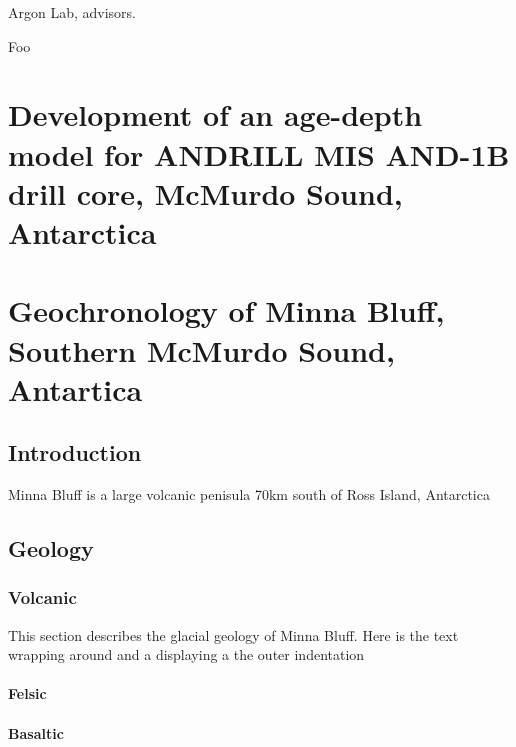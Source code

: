 \documentclass[12pt]{report}
\begin{document}
\begin{acknowledgments}
{Argon Lab, advisors.}

\end{acknowledgments}
\setcounter{tocdepth}{4}
\tableofcontents
%
%
\listoftables
\listoffigures
\signaturepage
\begin{preface}
{Foo}
\end{preface}

\chapter{Development of an age-depth model for ANDRILL MIS AND-1B drill core, McMurdo Sound, Antarctica}
\chapter{Geochronology of Minna Bluff, Southern McMurdo Sound, Antartica}
\section{Introduction}
Minna Bluff is a large volcanic penisula 70km south of Ross Island, Antarctica

\section{Geology}
\subsection{Volcanic}
This section describes the glacial geology of Minna Bluff. Here is the text
wrapping around and a displaying a the outer indentation

\subsubsection{Felsic}
\subsubsection{Basaltic}
\end{document}
